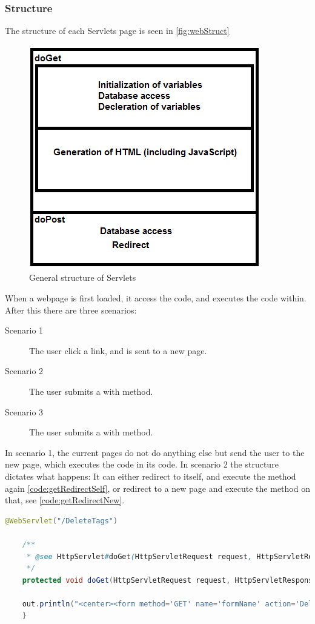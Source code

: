 \subsubsection{Structure}
The structure of each Servlets page is seen in \autoref{fig:webStruct}
\begin{figure}
	\centering
		\includegraphics{images/webStruct.png}
	\caption{General structure of Servlets}
	\label{fig:webStruct}
\end{figure}

When a webpage is first loaded, it access the  code, and executes the code within. After this there are three scenarios:
\begin{description}
	\item[Scenario 1] The user click a link, and is sent to a new page.
	\item[Scenario 2] The user submits a  with  method. 
	\item[Scenario 3] The user submits a  with  method.
\end{description}

In scenario 1, the current pages do not do anything else but send the user to the new page, which executes the code in its  code. In scenario 2 the  structure dictates what happens: It can either redirect to itself, and execute the  method again \autoref{code:getRedirectSelf}, or redirect to a new page and execute the  method on that, see \autoref{code:getRedirectNew}.

\begin{lstlisting}[language=Java,label=code:getRedirectSelf,caption=A form which redirect to its own get method]
	@WebServlet("/DeleteTags")
	
	/**
	 * @see HttpServlet#doGet(HttpServletRequest request, HttpServletResponse response)
	 */
	protected void doGet(HttpServletRequest request, HttpServletResponse response) throws ServletException, IOException {
	
	out.println("<center><form method='GET' name='formName' action='DeleteTags'>");
	}
\end{lstlisting}


